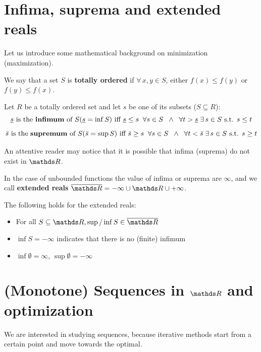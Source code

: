 \documentclass[computationalMathematics.tex]{subfiles}
\begin{document}
\section{Infima, suprema and extended reals}
Let us introduce some mathematical background on minimization (maximization).

\begin{definition}
  We say that a set $S$ is \textbf{totally ordered} if $\forall \, x, y \in S$, either $f(x) \leq f(y)$ or $f(y) \leq f(x)$.
\end{definition}

\begin{definition}
  Let $R$ be a totally ordered set and let $s$ be one of its subsets ($S \subseteq R$):
\[
  \underline{s}\text{ is the {\bf infimum} of } S (\underline{s} = \inf S) \text{ iff } \underline{s} \leq s \;\; \forall s \in S  \;\;\wedge\;\;  \forall t > \underline{s} \; \exists \, s \in S \mbox{ s.t. } s \leq t
\]
\[
  \bar{s} \text{ is the {\bf supremum} of } S (\bar{s} = \sup S) \text{ iff } \bar{s} \geq s \;\; \forall s \in S  \;\;\wedge\;\;  \forall t < \bar{s} \; \exists \, s \in S \mbox{ s.t. } s \geq t
\]
\end{definition}

\noindent An attentive reader may notice that it is possible that infima (suprema) do not exist in $\R$.

\begin{definition}
  In the case of unbounded functions the value of infima or suprema are $\infty$, and we call \textbf{extended reals} $\overline{\R} = {-\infty} \cup \R \cup {+\infty}$.
\end{definition}

\begin{property}
	The following holds for the extended reals:
\begin{itemize}
    \item For all $S \subseteq \R, \sup / \inf S \in \overline{\R}$
    \item $\inf S = -\infty $ indicates that there is no (finite) infimum
    \item $\inf \emptyset = \infty$, $\sup \emptyset = -\infty$
\end{itemize}
\end{property}

\section{(Monotone) Sequences in $\R$ and optimization}
\noindent We are interested in studying sequences, because iterative methods start from a certain point and move towards the optimal.
\end{document}
